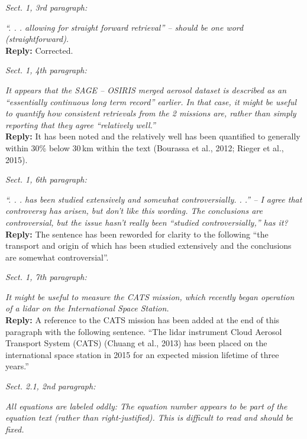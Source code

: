 \documentclass[12pt, notitlepage]{article}
\begin{document}
\textit{Sect. 1, 3rd paragraph:}

\textit{``. . . allowing for straight forward retrieval'' – should be one word (straightforward).}\\

\textbf{Reply:} Corrected.

\hrulefill

\textit{Sect. 1, 4th paragraph:}

\textit{It appears that the SAGE – OSIRIS merged aerosol dataset is described as an ``essentially
continuous long term record'' earlier. In that case, it might be useful to quantify
how consistent retrievals from the 2 missions are, rather than simply reporting that they
agree ``relatively well.''}\\

\textbf{Reply:} It has been noted and the relatively well has been quantified to generally within 30\% below 30\,km within the text (Bourassa et al., 2012; Rieger et al., 2015).

\hrulefill

\textit{Sect. 1, 6th paragraph:}

\textit{``. . . has been studied extensively and somewhat controversially. . .'' – I agree that controversy
has arisen, but don't like this wording. The conclusions are controversial, but
the issue hasn't really been ``studied controversially,'' has it?}\\

\textbf{Reply:} The sentence has been reworded for clarity to the following ``the transport and origin of which has been
studied extensively and the conclusions are somewhat controversial''.

\hrulefill

\textit{Sect. 1, 7th paragraph:}

\textit{It might be useful to measure the CATS mission, which recently began operation of a
lidar on the International Space Station.}\\

\textbf{Reply:} A reference to the CATS mission has been added at the end of this paragraph with the following sentence. ``The lidar instrument Cloud Aerosol Transport System (CATS) (Chuang et al., 2013) has been placed on the international space station in 2015 for an expected mission lifetime of three years.''

\hrulefill

\textit{Sect. 2.1, 2nd paragraph:}

\textit{All equations are labeled oddly: The equation number appears to be part of the equation
text (rather than right-justified). This is difficult to read and should be fixed.}\\
\end{document}
